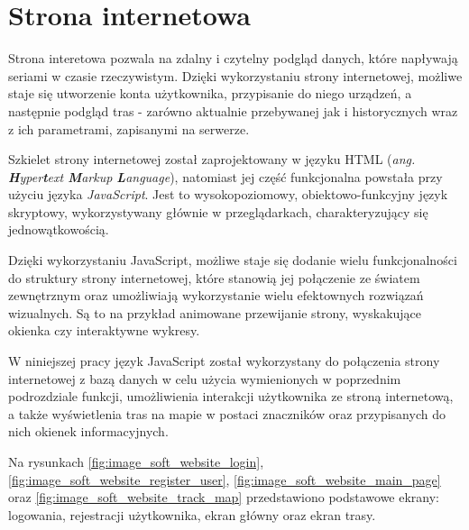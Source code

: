 \section{Strona internetowa}
\lstset{language=HTML, inputencoding=utf8, breaklines=true}

Strona interetowa pozwala na zdalny i czytelny podgląd danych, które napływają seriami w czasie rzeczywistym. Dzięki wykorzystaniu strony internetowej, możliwe staje się utworzenie konta użytkownika, przypisanie do niego urządzeń, a następnie podgląd tras - zarówno aktualnie przebywanej jak i historycznych wraz z ich parametrami, zapisanymi na serwerze.

Szkielet strony internetowej został zaprojektowany w języku HTML (\textit{ang. \textbf{H}yper\textbf{t}ext \textbf{M}arkup \textbf{L}anguage}), natomiast jej część funkcjonalna powstała przy użyciu języka \textit{JavaScript}. Jest to wysokopoziomowy, obiektowo-funkcyjny język skryptowy, wykorzystywany głównie w przeglądarkach, charakteryzujący się jednowątkowością.

Dzięki wykorzystaniu JavaScript, możliwe staje się dodanie wielu funkcjonalności do struktury strony internetowej, które stanowią jej połączenie ze światem zewnętrznym oraz umożliwiają wykorzystanie wielu efektownych rozwiązań wizualnych. Są to na przykład animowane przewijanie strony, wyskakujące okienka czy interaktywne wykresy.

W niniejszej pracy język JavaScript został wykorzystany do połączenia strony internetowej z bazą danych w celu użycia wymienionych w poprzednim podrozdziale funkcji, umożliwienia interakcji użytkownika ze stroną internetową, a także wyświetlenia tras na mapie w postaci znaczników oraz przypisanych do nich okienek informacyjnych.  

Na rysunkach \ref{fig:image_soft_website_login}, \ref{fig:image_soft_website_register_user}, \ref{fig:image_soft_website_main_page} oraz \ref{fig:image_soft_website_track_map} przedstawiono podstawowe ekrany: logowania, rejestracji użytkownika, ekran główny oraz ekran trasy.

